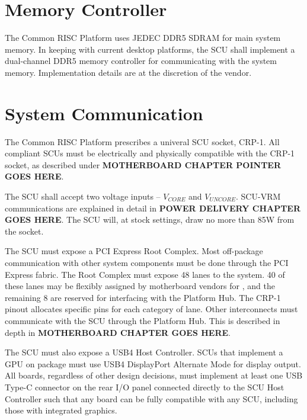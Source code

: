 \documentclass[12pt]{report}
\begin{document}
\section{Memory Controller}
The Common RISC Platform uses JEDEC DDR5 SDRAM for main system memory. In keeping with current desktop platforms, the SCU
shall implement a dual-channel DDR5 memory controller for communicating with the system memory. Implementation details
are at the discretion of the vendor.

\section{System Communication}
The Common RISC Platform prescribes a univeral SCU socket, CRP-1. All compliant SCUs must be electrically and physically
compatible with the CRP-1 socket, as described under \textbf{MOTHERBOARD CHAPTER POINTER GOES HERE}.

The SCU shall accept two voltage inputs -- $V_{CORE}$ and $V_{UNCORE}$. SCU-VRM communications are explained in detail
in \textbf{POWER DELIVERY CHAPTER GOES HERE}. The SCU will, at stock settings, draw no more than 85W from the socket.

The SCU must expose a PCI Express Root Complex. Most off-package communication with other system components must be done
through the PCI Express fabric. The Root Complex must expose 48 lanes to the system. 40 of these lanes may be flexibly
assigned by motherboard vendors for , and the remaining 8 are reserved for interfacing with
the Platform Hub. The CRP-1 pinout allocates specific pins for each category of lane. Other interconnects must communicate
with the SCU through the Platform Hub. This is described in depth in \textbf{MOTHERBOARD CHAPTER GOES HERE}.

The SCU must also expose a USB4 Host Controller. SCUs that implement a GPU on package must use USB4 DisplayPort Alternate
Mode for display output. All boards, regardless of other design decisions, must implement at least one USB Type-C connector
on the rear I/O panel connected directly to the SCU Host Controller such that any board can be fully compatible with
any SCU, including those with integrated graphics.

\end{document}
